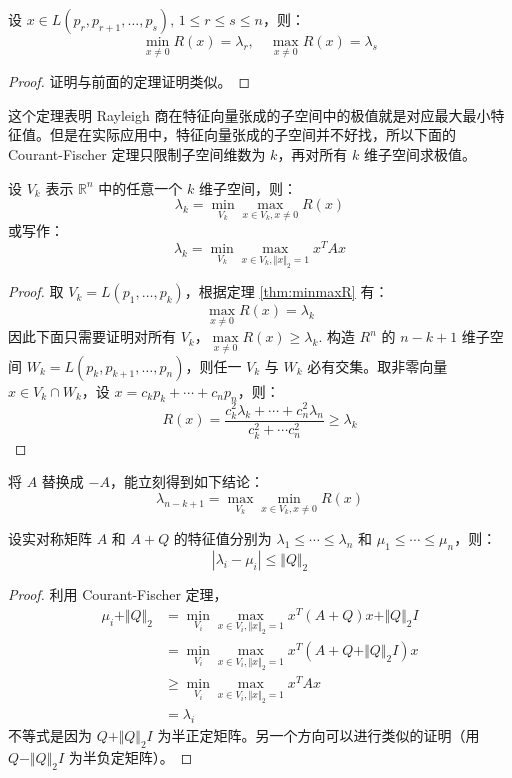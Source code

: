 \begin{theorem}
\label{thm:minmaxR}
设 $x\in L(p_r,p_{r+1},\ldots,p_s),\,1\leq r\leq s\leq n$，则：
\[
    \min_{x\neq 0}R(x)=\lambda_r,\quad\max_{x\neq 0}R(x)=\lambda_s
\]
\end{theorem}
\begin{proof}
证明与前面的定理证明类似。
\end{proof}
\begin{remark}
这个定理表明 Rayleigh 商在特征向量张成的子空间中的极值就是对应最大最小特征值。但是在实际应用中，特征向量张成的子空间并不好找，所以下面的 Courant-Fischer 定理只限制子空间维数为 $k$，再对所有 $k$ 维子空间求极值。
\end{remark}

\begin{theorem}
设 $V_k$ 表示 $\mathbb R^n$ 中的任意一个 $k$ 维子空间，则：
\[
    \lambda_k=\min_{V_k}\max_{x\in V_k,x\neq0}R(x)
\]
或写作：
\[
    \lambda_k=\min_{V_k}\max_{x\in V_k,\Vert x\Vert_2=1}x^TAx
\]
\end{theorem}
\begin{proof}
取 $V_k=L(p_1,\ldots,p_k)$，根据定理 \ref{thm:minmaxR} 有：
\[
    \max_{x\neq 0}R(x)=\lambda_k
\]
因此下面只需要证明对所有 $V_k$，$\max\limits_{x\neq 0}R(x)\geq \lambda_k$.
构造 $R^n$ 的 $n-k+1$ 维子空间 $W_k=L(p_k,p_{k+1},\ldots,p_n)$，则任一 $V_k$ 与 $W_k$ 必有交集。取非零向量 $x\in V_k\cap W_k$，设 $x=c_kp_k+\cdots+c_np_n$，则：
\[
    R(x)=\frac{c_k^2\lambda_k+\cdots+c_n^2\lambda_n}{c_k^2+\cdots c_n^2}\geq \lambda_k
\]
\end{proof}

\begin{corollary}
将 $A$ 替换成 $-A$，能立刻得到如下结论：
\[
    \lambda_{n-k+1}=\max_{V_k}\min_{x\in V_k,x\neq0}R(x)
\]
\end{corollary}

\begin{theorem}
\label{thm:AAQ}
设实对称矩阵 $A$ 和 $A+Q$ 的特征值分别为 $\lambda_1\leq\cdots\leq\lambda_n$ 和 $\mu_1\leq\cdots\leq\mu_n$，则：
$$
|\lambda_i-\mu_i|\leq \Vert Q\Vert_2
$$
\end{theorem}
\begin{proof}
利用 Courant-Fischer 定理，
\begin{align*}
    \mu_i+\Vert Q\Vert_2&=\min_{V_i}\max_{x\in V_i,\Vert x\Vert_2=1}x^T(A+Q)x+\Vert Q\Vert_2I\\
    &=\min_{V_i}\max_{x\in V_i,\Vert x\Vert_2=1}x^T(A+Q+\Vert Q\Vert_2I)x\\
    &\geq\min_{V_i}\max_{x\in V_i,\Vert x\Vert_2=1}x^TAx\\
    &=\lambda_i
\end{align*}
不等式是因为 $Q+\Vert Q\Vert_2I$ 为半正定矩阵。另一个方向可以进行类似的证明（用 $Q-\Vert Q\Vert_2I$ 为半负定矩阵）。
\end{proof}


